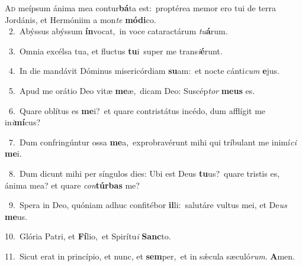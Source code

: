 \lettrine{\initial\textcolor{\initialcolor}{A}}{d} meípsum ánima mea contur\-\textbf{bá}\-ta est:~\star proptérea memor ero tui de terra Jordánis, et Hermóniim a mon\textit{te} \textbf{mó}\-\textbf{di}co.\\
{\numbfont\textcolor{\numbcolor}{~2.}}~Abýssus abýssum \textbf{ín}\-vocat,~\star in voce cataractárum \textit{tu}\-\textbf{á}rum.\par
{\numbfont\textcolor{\numbcolor}{~3.}}~Omnia excélsa tua, et fluctus \textbf{tu}\-i~\star super me trans\-\textit{i}\-\textbf{é}runt.\par
{\numbfont\textcolor{\numbcolor}{~4.}}~In die mandávit Dóminus misericórdiam \textbf{su}\-am:~\star et nocte cánti\textit{cum} \textbf{e}\-jus.\par
{\numbfont\textcolor{\numbcolor}{~5.}}~Apud me orátio Deo vitæ \textbf{me}\-æ,~\star dicam Deo: Suscép\textit{tor} \textbf{me}\-\textbf{us} es.\par
{\numbfont\textcolor{\numbcolor}{~6.}}~Quare oblítus es \textbf{me}\-i?~\star et quare contristátus incédo, dum afflígit me in\-\textit{i}\-\textbf{mí}cus?\par
{\numbfont\textcolor{\numbcolor}{~7.}}~Dum confringúntur ossa \textbf{me}\-a,~\star exprobravérunt mihi qui tríbulant me inimí\textit{ci} \textbf{me}\-i.\par
{\numbfont\textcolor{\numbcolor}{~8.}}~Dum dicunt mihi per síngulos dies: Ubi est Deus \textbf{tu}\-us?~\star quare tristis es, ánima mea? et quare \textit{con}\-\textbf{túr}\textbf{bas} me?\par
{\numbfont\textcolor{\numbcolor}{~9.}}~Spera in Deo, quóniam adhuc confitébor \textbf{il}\-li:~\star salutáre vultus mei, et De\textit{us} \textbf{me}\-us.\par
{\numbfont\textcolor{\numbcolor}{10.}}~Glória Patri, et \textbf{Fí}\-lio,~\star et Spirítu\textit{i} \textbf{Sanc}\-to.\par
{\numbfont\textcolor{\numbcolor}{11.}}~Sicut erat in princípio, et nunc, et \textbf{sem}\-per,~\star et in sǽcula sæculó\-\textit{rum}\-. \textbf{A}\-men.\par
